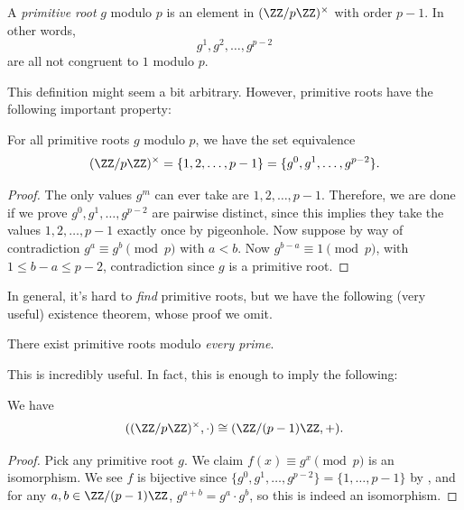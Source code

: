 \documentclass[11pt]{scrartcl}
\begin{document}
\begin{definition}
	A \emph{primitive root} $g$ modulo $p$ is an element in $(\ZZ/p\ZZ)^\times$ with order $p - 1$. In other words,
	\[g^1,g^2,\dots,g^{p - 2}\]
	are all not congruent to $1$ modulo $p$.
\end{definition}

This definition might seem a bit arbitrary. However, primitive roots have the following important property:

\begin{theorem}\label{thm:prim_roots_generate}
	For all primitive roots $g$ modulo $p$, we have the set equivalence
	\[(\ZZ/p\ZZ)^\times = \{1,2,\dots,p - 1\} = \{g^0,g^1,\dots,g^{p - 2}\}.\]
\end{theorem}

\begin{proof}
	The only values $g^m$ can ever take are $1,2,\dots,p - 1$. Therefore, we are done if we prove $g^0,g^1,\dots,g^{p - 2}$ are pairwise distinct, since this implies they take the values $1,2,\dots,p - 1$ exactly once by pigeonhole. Now suppose by way of contradiction $g^a \equiv g^b \pmod{p}$ with $a < b$. Now $g^{b - a} \equiv 1 \pmod{p}$, with $1 \le b - a \le p - 2$, contradiction since $g$ is a primitive root.
\end{proof}

In general, it's hard to \emph{find} primitive roots, but we have the following (very useful) existence theorem, whose proof we omit.

\begin{theorem}
	There exist primitive roots modulo \emph{every prime}. 
\end{theorem}

This is incredibly useful. In fact, this is enough to imply the following:

\begin{theorem}\label{thm:cyclic}
	We have
	\[((\ZZ/p\ZZ)^\times,\cdot) \cong (\ZZ/(p - 1)\ZZ,+).\]
\end{theorem}

\begin{proof}
	Pick any primitive root $g$. We claim $f(x) \equiv g^x \pmod{p}$ is an isomorphism. We see $f$ is bijective since $\{g^0,g^1,\dots,g^{p - 2}\} = \{1,\dots,p - 1\}$ by , and for any $a,b \in \ZZ/(p - 1)\ZZ$, $g^{a + b} = g^a \cdot g^b$, so this is indeed an isomorphism.
\end{proof}
\end{document}
